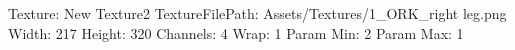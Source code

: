 Texture: New Texture2
TextureFilePath: Assets/Textures/1_ORK_right leg.png
Width: 217
Height: 320
Channels: 4
Wrap: 1
Param Min: 2
Param Max: 1